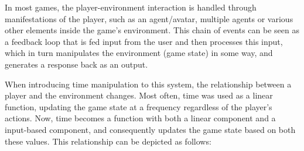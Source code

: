 In most games, the player-environment interaction is handled through manifestations of the player, such as an agent/avatar, multiple agents or various other elements inside the game's environment. This chain of events can be seen as a feedback loop that is fed input from the user and then processes this input, which in turn manipulates the environment (game state) in some way, and generates a response back as an output.

When introducing time manipulation to this system, the relationship between a player and the environment changes. Most often, time was used as a linear function, updating the game state at a frequency regardless of the player's actions. Now, time becomes a function with both a linear component and a input-based component, and consequently updates the game state based on both these values. This relationship can be depicted as follows:

 
